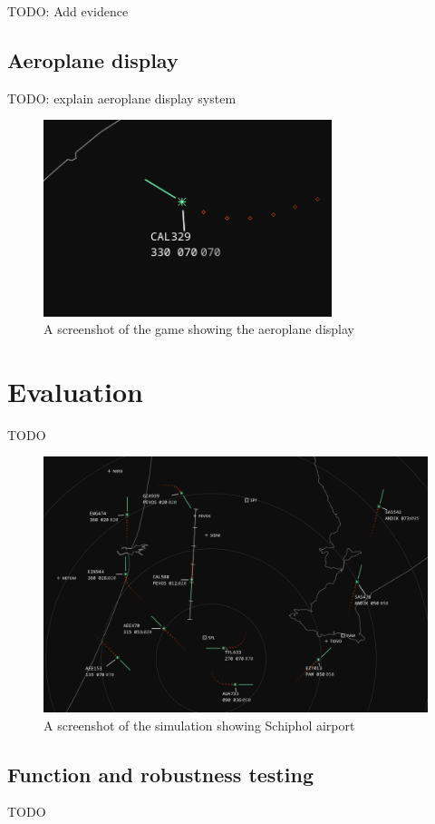 \documentclass{article}
\begin{document}
TODO: Add evidence


\subsection{Aeroplane display}
TODO: explain aeroplane display system
\begin{figure}[H]
\centering
\includegraphics[width=0.75\textwidth]{screenshots/aeroplane.png}
\caption{\label{fig:aeroplane}A screenshot of the game showing the aeroplane display}
\end{figure}

\section{Evaluation}
TODO
\begin{figure}[H]
\centering
\includegraphics[width=\textwidth]{screenshots/schiphol2.png}
\caption{\label{fig:schiphol}A screenshot of the simulation showing Schiphol airport}
\end{figure}


\subsection{Function and robustness testing}
TODO
\end{document}
